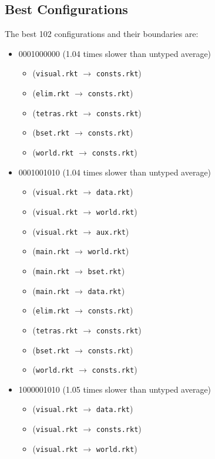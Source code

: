 \documentclass{article}
\newcommand{\mono}[1]{\texttt{#1}}
\begin{document}
\subsection{Best Configurations}
The best 102 configurations and their boundaries are:
\begin{itemize}
\item 0001000000 (1.04 times slower than untyped average)
  \begin{itemize}
  \item (\mono{visual.rkt} $\rightarrow$ \mono{consts.rkt})
  \item (\mono{elim.rkt} $\rightarrow$ \mono{consts.rkt})
  \item (\mono{tetras.rkt} $\rightarrow$ \mono{consts.rkt})
  \item (\mono{bset.rkt} $\rightarrow$ \mono{consts.rkt})
  \item (\mono{world.rkt} $\rightarrow$ \mono{consts.rkt})
  \end{itemize}
\item 0001001010 (1.04 times slower than untyped average)
  \begin{itemize}
  \item (\mono{visual.rkt} $\rightarrow$ \mono{data.rkt})
  \item (\mono{visual.rkt} $\rightarrow$ \mono{world.rkt})
  \item (\mono{visual.rkt} $\rightarrow$ \mono{aux.rkt})
  \item (\mono{main.rkt} $\rightarrow$ \mono{world.rkt})
  \item (\mono{main.rkt} $\rightarrow$ \mono{bset.rkt})
  \item (\mono{main.rkt} $\rightarrow$ \mono{data.rkt})
  \item (\mono{elim.rkt} $\rightarrow$ \mono{consts.rkt})
  \item (\mono{tetras.rkt} $\rightarrow$ \mono{consts.rkt})
  \item (\mono{bset.rkt} $\rightarrow$ \mono{consts.rkt})
  \item (\mono{world.rkt} $\rightarrow$ \mono{consts.rkt})
  \end{itemize}
\item 1000001010 (1.05 times slower than untyped average)
  \begin{itemize}
  \item (\mono{visual.rkt} $\rightarrow$ \mono{data.rkt})
  \item (\mono{visual.rkt} $\rightarrow$ \mono{consts.rkt})
  \item (\mono{visual.rkt} $\rightarrow$ \mono{world.rkt})

\end{itemize}
\end{itemize}
\end{document}
